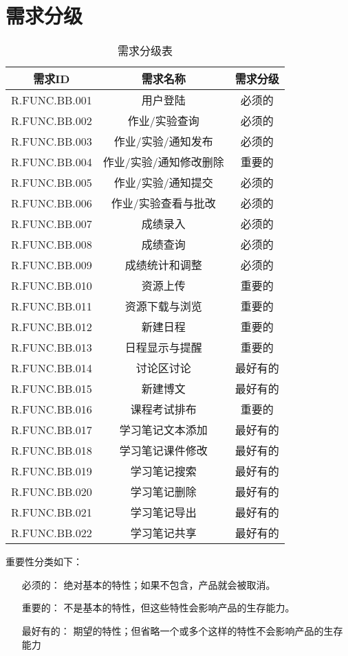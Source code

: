 \chapter{需求分级}
\begin{table}[htbp]
\centering
\caption{需求分级表} \label{tab:classification}
\begin{tabular}{|c|c|c|}
    \hline
    需求ID & 需求名称 & 需求分级 \\
    \hline
    R.FUNC.BB.001 & 用户登陆 & 必须的 \\
    \hline
    R.FUNC.BB.002 & 作业/实验查询 & 必须的 \\
    \hline
    R.FUNC.BB.003 & 作业/实验/通知发布 & 必须的 \\
    \hline
    R.FUNC.BB.004 & 作业/实验/通知修改删除 & 重要的 \\
    \hline
    R.FUNC.BB.005 & 作业/实验/通知提交 & 必须的 \\
    \hline
    R.FUNC.BB.006 & 作业/实验查看与批改 & 必须的 \\
    \hline
    R.FUNC.BB.007 & 成绩录入 & 必须的 \\
    \hline
    R.FUNC.BB.008 & 成绩查询 & 必须的 \\
    \hline
    R.FUNC.BB.009 & 成绩统计和调整 & 必须的 \\
    \hline
    R.FUNC.BB.010 & 资源上传 & 重要的 \\
    \hline
    R.FUNC.BB.011 & 资源下载与浏览 & 重要的 \\
    \hline
    R.FUNC.BB.012 & 新建日程 & 重要的 \\
    \hline
    R.FUNC.BB.013 & 日程显示与提醒 & 重要的 \\
    \hline
    R.FUNC.BB.014 & 讨论区讨论 & 最好有的 \\
    \hline
    R.FUNC.BB.015 & 新建博文 & 最好有的 \\
    \hline
    R.FUNC.BB.016 & 课程考试排布 & 重要的 \\
    \hline
    R.FUNC.BB.017 & 学习笔记文本添加 & 最好有的 \\
    \hline
    R.FUNC.BB.018 & 学习笔记课件修改 & 最好有的 \\
    \hline
    R.FUNC.BB.019 & 学习笔记搜索 & 最好有的 \\
    \hline
    R.FUNC.BB.020 & 学习笔记删除 & 最好有的 \\
    \hline
    R.FUNC.BB.021 & 学习笔记导出 & 最好有的 \\
    \hline
    R.FUNC.BB.022 & 学习笔记共享 & 最好有的 \\
    \hline
\end{tabular}
\end{table}


重要性分类如下：
\begin{itemize}
\item[必须的：]		绝对基本的特性；如果不包含，产品就会被取消。
\item[重要的：]		不是基本的特性，但这些特性会影响产品的生存能力。
\item[最好有的：]		期望的特性；但省略一个或多个这样的特性不会影响产品的生存能力
\end{itemize}
